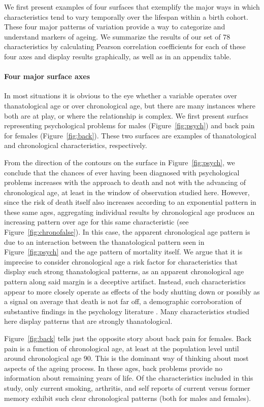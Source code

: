 \documentclass[11pt,oneside,a4paper]{article}
\begin{document}
We first present examples of four surfaces that exemplify the major ways in
which characteristics tend to vary temporally over the lifespan within a birth
cohort. These four major patterns of variation provide a way to categorize and
understand markers of ageing. We summarize the results of our set of 78
characteristics by calculating Pearson correlation coefficients for each of
these four axes and display results graphically, as well as in an appendix
table.

\paragraph{Four major surface axes}
In most situations it is obvious to the eye whether a
variable operates over thanatological age or over chronological age, but there
are many instances where both are at play, or where the relationship is
complex. We first present surfacs representing psychological problems for males
(Figure~\ref{fig:psych}) and back pain for females (Figure~\ref{fig:back}).
These two surfaces are examples of thanatological and
chronological characteristics, respectively.

From the direction of the contours on the surface in Figure~\ref{fig:psych}, we
conclude that the chances of ever having been diagnosed with psychological
problems increases with the approach to death and not with the advancing of
chronological age, at least in the window of observation studied here.
However, since the risk of death itself also increases according to an
exponential pattern in these same ages, aggregating individual results by
chronological age produces an increasing pattern over age for this same
characteristic (see Figure~\ref{fig:chronofalse}).
In this case, the apparent chronological age pattern is due
to an interaction between the thanatological pattern seen in
Figure~\ref{fig:psych} and the age pattern of mortality itself. We argue that it
is imprecise to consider chronological age a risk factor for characteristics that display such strong thanatological patterns, as an
apparent chronological age pattern along said margin is a deceptive artifact.
Instead, such characteristics appear to more closely operate as effects of the body shutting down or possibly as a signal on average that death is not far off, a demographic corroboration of substantive findings in the psychology literature \citep{carstensen2006influence}. Many characteristics studied here display patterns that are strongly thanatological.

Figure~\ref{fig:back} tells just the opposite story about back pain for females.
Back pain is a function of
chronological age, at least at the population level until around chronological
age 90. This is the dominant way of thinking about most aspects of the ageing
process. In these ages, back problems provide no information about remaining
years of life. Of the characteristics included in this
study, only current smoking, arthritis, and self reports of current versus former memory exhibit such clear chronological patterns (both for males and
females).
\end{document}
